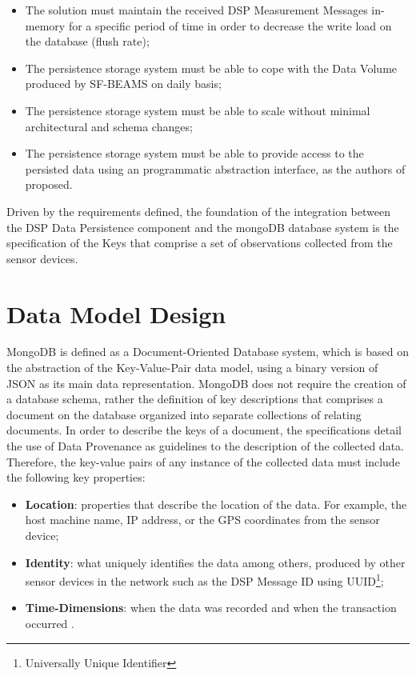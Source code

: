 \begin{itemize}
  \item The solution must maintain the received DSP Measurement Messages
  in-memory for a specific period of time in order to decrease the write load
  on the database (flush rate);
  \item The persistence storage system must be able to cope with the Data
  Volume produced by SF-BEAMS on daily basis;
  \item The persistence storage system must be able to scale without minimal
  architectural and schema changes;
  \item The persistence storage system must be able to provide access to the
  persisted data using an programmatic abstraction interface, as the authors
  of \cite{sn-programming-language} proposed.
\end{itemize}

Driven by the requirements defined, the foundation of the integration between
the DSP Data Persistence component and the mongoDB database system is the
specification of the Keys that comprise a set of observations collected from
the sensor devices.

\section{Data Model Design}
\label{sec:dsp-persistence-data-model}

MongoDB is defined as a Document-Oriented Database system, which is based on 
the abstraction of the Key-Value-Pair data model, using a binary version of JSON
\cite{json} as its main data representation. MongoDB does not require the creation 
of a database schema, rather the definition of key descriptions that comprises
a document on the database organized into separate collections of relating
documents. In order to describe the keys of a document, the specifications
detail the use of Data Provenance as guidelines to the description of the
collected data. Therefore, the key-value pairs of any instance of the
collected data must include the following key properties:

\begin{itemize}
  \item \textbf{Location}: properties that describe the location of the data.
  For example, the host machine name, IP address, or the GPS coordinates
  \cite{gps} from the sensor device;
  \item \textbf{Identity}: what uniquely identifies the data among 
  others, produced by other sensor devices in the network such as the DSP
  Message ID using UUID\footnote{Universally Unique Identifier};
  \item \textbf{Time-Dimensions}: when the data was recorded 
  \cite{db-provenance} and when the transaction occurred \cite{sn-time-series}.
\end{itemize}

